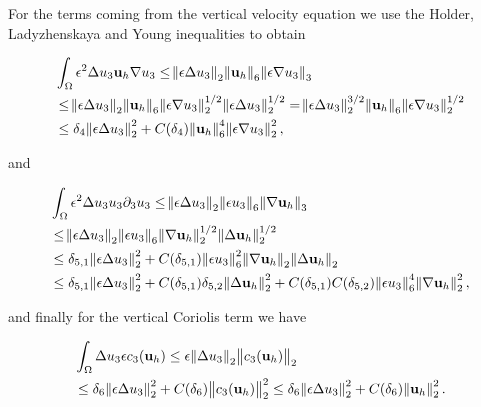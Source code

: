 \documentclass[11pt]{article}
\begin{document}
For the terms coming from the vertical velocity equation we use the Holder, Ladyzhenskaya and Young inequalities to obtain

\begin{equation}
  \begin{split}
    & \int_\Omega \epsilon^2 \Delta u_3 \mathbf{u}_h \nabla u_3 \leq \norm{\epsilon \Delta u_3}_2 \norm{\mathbf{u}_h}_6 \norm{\epsilon \nabla u_3}_3 \\
    & \leq \norm{\epsilon \Delta u_3}_2 \norm{\mathbf{u}_h}_6 \norm{\epsilon \nabla u_3}_2^{1/2} \norm{\epsilon \Delta u_3}_2^{1/2} =  \norm{\epsilon \Delta u_3}^{3/2}_2 \norm{\mathbf{u}_h}_6 \norm{\epsilon \nabla u_3}_2^{1/2}\\
    & \leq \delta_4 \norm{\epsilon \Delta u_3}_2^2 + C(\delta_4) \norm{\mathbf{u}_h}^4_6 \norm{\epsilon \nabla u_3}^2_2,
  \end{split}
\end{equation}

and

\begin{equation}
\begin{split}
    & \int_\Omega \epsilon^2 \Delta u_3 u_3 \partial_3 u_3 \leq \norm{\epsilon \Delta u_3}_2 \norm{\epsilon u_3}_6 \norm{\nabla \mathbf{u}_h}_3 \\
    & \leq \norm{\epsilon \Delta u_3}_2 \norm{\epsilon u_3}_6 \norm{\nabla \mathbf{u}_h}_2^{1/2} \norm{\Delta \mathbf{u}_h}_2^{1/2} \\
    & \leq \delta_{5,1} \norm{\epsilon \Delta u_3}_2^2 + C(\delta_{5,1}) \norm{\epsilon u_3}^2_6 \norm{\nabla \mathbf{u}_h}_2 \norm{\Delta \mathbf{u}_h}_2 \\
    & \leq \delta_{5,1} \norm{\epsilon \Delta u_3}_2^2 + C(\delta_{5,1}) \delta_{5,2}\norm{\Delta \mathbf{u}_h}_2 ^ 2 + C(\delta_{5,1}) C(\delta_{5,2}) \norm{\epsilon u_3}^4_6 \norm{\nabla \mathbf{u}_h}^2_2,
  \end{split}
\end{equation}

and finally for the vertical Coriolis term we have

\begin{equation}
  \begin{split}
  & \int_\Omega \Delta u_3 \epsilon c_3 (\mathbf{u}_h) \leq \epsilon \norm{\Delta u_3}_2 \norm{c_3 (\mathbf{u}_h)}_2 \\
  & \leq \delta_6 \norm{\epsilon \Delta u_3}^2_2 + C(\delta_6) \norm{c_3 (\mathbf{u}_h)}_2^2 \leq \delta_6 \norm{\epsilon \Delta u_3}^2_2 + C(\delta_6) \norm{\mathbf{u}_h}_2^2.
  \end{split}
\end{equation}
\end{document}
